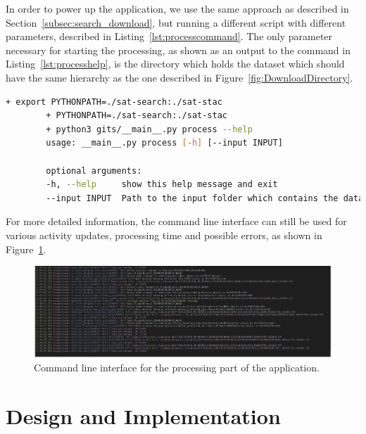 \documentclass[12pt, a4paper]{report}
\begin{document}
	\begin{lstlisting}[caption={Help command for processing.},label={lst:processcommand},language=Bash]
	% bash -x run_process.sh --help
	\end{lstlisting}

	In order to power up the application, we use the same approach as described in Section~\ref{subsec:search_download}, but running a different script with different parameters, described in Listing~\ref{lst:processcommand}. The only parameter necessary for starting the processing, as shown as an output to the command in Listing~\ref{lst:processhelp}, is the directory which holds the dataset which should have the same hierarchy as the one described in Figure~\ref{fig:DownloadDirectory}.

	\begin{lstlisting}[caption={Detailed parameters required for the download script.},label={lst:processhelp},language=Bash]
		+ export PYTHONPATH=./sat-search:./sat-stac
		+ PYTHONPATH=./sat-search:./sat-stac
		+ python3 gits/__main__.py process --help
		usage: __main__.py process [-h] [--input INPUT]
		
		optional arguments:
		-h, --help     show this help message and exit
		--input INPUT  Path to the input folder which contains the dataset of glaciers.
	\end{lstlisting}

	For more detailed information, the command line interface can still be used for various activity updates, processing time and possible errors, as shown in Figure~\ref{fig:process_cmd}.

	\begin{figure}[h!]
	\centering
	\includegraphics[width=\columnwidth]{../images/process_cmd.png}
	\caption{Command line interface for the processing part of the application.}
	\label{fig:process_cmd}
	\end{figure}

	\newpage{}
	\chapter{Design and Implementation}
	\label{cha:design_and_implementation}
	
\end{document}
